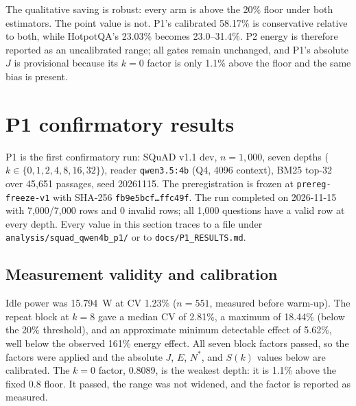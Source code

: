 \documentclass[a4paper,fleqn]{cas-sc}
\begin{document}
The qualitative saving is robust: every arm is above the 20\% floor under both
estimators. The point value is not. P1's calibrated 58.17\% is conservative
relative to both, while HotpotQA's 23.03\% becomes 23.0--31.4\%. P2 energy is
therefore reported as an uncalibrated range; all gates remain unchanged, and
P1's absolute $J$ is provisional because its $k=0$ factor is only 1.1\% above
the floor and the same bias is present.

\section{P1 confirmatory results}\label{sec:s6}

P1 is the first confirmatory run: SQuAD v1.1 dev, $n=1{,}000$, seven depths
($k\in\{0,1,2,4,8,16,32\}$), reader \texttt{qwen3.5:4b} (Q4, 4096 context), BM25 top-32 over
45{,}651 passages, seed 20261115. The preregistration is frozen at \texttt{prereg-freeze-v1}
with SHA-256 \texttt{fb9e5bcf\ldots ffc49f}. The run completed on 2026-11-15 with 7{,}000/7{,}000
rows and 0 invalid rows; all 1{,}000 questions have a valid row at every depth. Every value in
this section traces to a file under \texttt{analysis/squad\_qwen4b\_p1/} or to
\texttt{docs/P1\_RESULTS.md}.

\subsection{Measurement validity and calibration}

Idle power was 15.794~W at CV 1.23\% ($n=551$, measured before warm-up). The repeat block at
$k=8$ gave a median CV of 2.81\%, a maximum of 18.44\% (below the 20\% threshold), and an
approximate minimum detectable effect of 5.62\%, well below the observed 161\% energy effect.
All seven block factors passed, so the factors were
applied and the absolute $J$, $E$, $N^{*}$, and $S(k)$ values below are calibrated. The $k=0$
factor, 0.8089, is the weakest depth: it is 1.1\% above the fixed 0.8 floor. It passed, the range
was not widened, and the factor is reported as measured.
\end{document}
